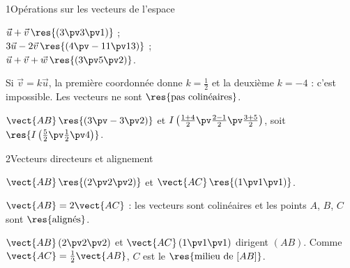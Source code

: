

\begin{deuxcolonnes}

\begin{corrige}{1}{Opérations sur les vecteurs de l'espace}
\begin{questions}
  \item $\vec u+\vec v\,\res{(3\pv3\pv1)}$ ;\\ $3\vec u-2\vec v\,\res{(4\pv-11\pv13)}$ ;\\ $\vec u+\vec v+\vec w\,\res{(3\pv5\pv2)}$.
  \item Si $\vec v=k\vec u$, la première coordonnée donne $k=\frac12$ et la deuxième $k=-4$ : c'est impossible. Les vecteurs ne
    sont $\res{\text{pas colinéaires}}$.
  \item $\vect{AB}\,\res{(3\pv-3\pv2)}$ et $I\left(\frac{1+4}{2}\pv\frac{2-1}{2}\pv\frac{3+5}{2}\right)$, soit
    $\res{I\left(\tfrac52\pv\tfrac12\pv4\right)}$.
\end{questions}
\end{corrige}

\begin{corrige}{2}{Vecteurs directeurs et alignement}
\begin{questions}
  \item $\vect{AB}\,\res{(2\pv2\pv2)}$ et $\vect{AC}\,\res{(1\pv1\pv1)}$.
  \item $\vect{AB}=2\vect{AC}$ : les vecteurs sont colinéaires et les points $A$, $B$, $C$ sont $\res{\text{alignés}}$.
  \item $\vect{AB}\,(2\pv2\pv2)$ et $\vect{AC}\,(1\pv1\pv1)$ dirigent $(AB)$. Comme $\vect{AC}=\frac12\vect{AB}$, $C$ est le
    $\res{\text{milieu de }[AB]}$.
\end{questions}
\end{corrige}


\end{deuxcolonnes}
